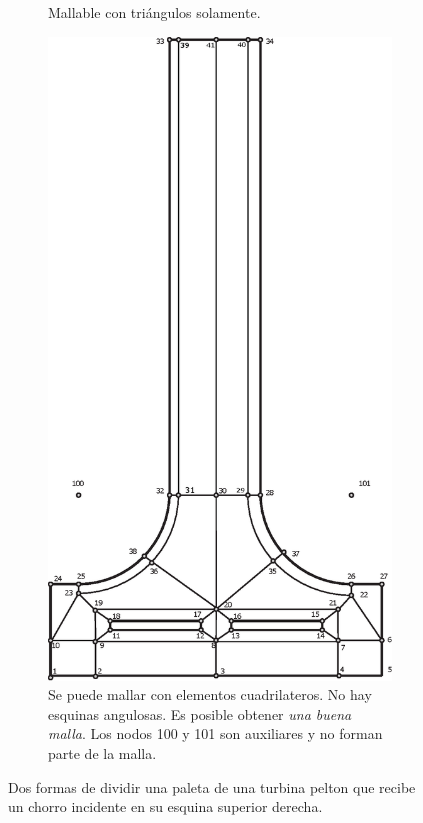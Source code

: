 \begin{figure}[htb!]
\begin{subfigure}{0.49\textwidth}
		\caption{Mallable con triángulos solamente.}
	\end{subfigure}
	\begin{subfigure}{0.49\textwidth}
		\centering
	\includegraphics[width=.7\linewidth]{fig/divisionPelton2.eps}
	\caption{Se puede mallar con elementos cuadrilateros. No hay esquinas angulosas. Es posible obtener \textit{una buena malla}. Los nodos 100 y 101 son auxiliares y no forman parte de la malla.}
	\label{fig:buendivisiondominio}
	\end{subfigure}
	\caption{Dos formas de dividir una paleta de una turbina pelton que recibe un chorro incidente en su esquina superior derecha.}
\end{figure}
